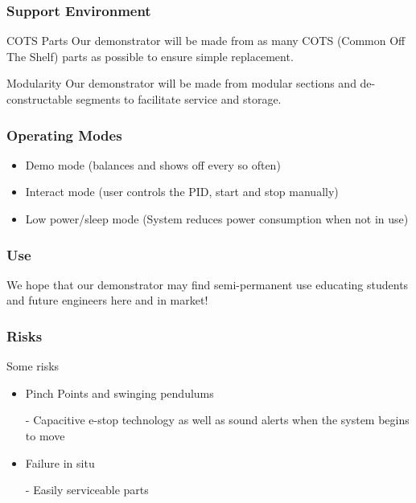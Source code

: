 \documentclass{beamer}
\begin{document}
\begin{frame}
\frametitle{Support Environment}

\begin{block}{COTS Parts}
    Our demonstrator will be made from as many COTS (Common Off The Shelf) parts
    as possible to ensure simple replacement.
\end{block}

\begin{block}{Modularity}
    Our demonstrator will be made from modular sections and de-constructable segments
    to facilitate service and storage.
\end{block}

\end{frame}


\begin{frame}
\frametitle{Operating Modes}

\begin{itemize}
 \item Demo mode (balances and shows off every so often)
 \item Interact mode (user controls the PID, start and stop manually)
 \item Low power/sleep mode (System reduces power consumption when not in use)
\end{itemize}

\end{frame}


\begin{frame}
\frametitle{Use}

We hope that our demonstrator may find semi-permanent use educating students and future
engineers here and in market!

\end{frame}


\begin{frame}
\frametitle{Risks}

Some risks

\begin{itemize}
 \item Pinch Points and swinging pendulums
 \item [-] Capacitive e-stop technology as well as sound alerts when the system begins to move
 \item Failure in situ
 \item [-] Easily serviceable parts
\end{itemize}

\end{frame}
\end{document}
